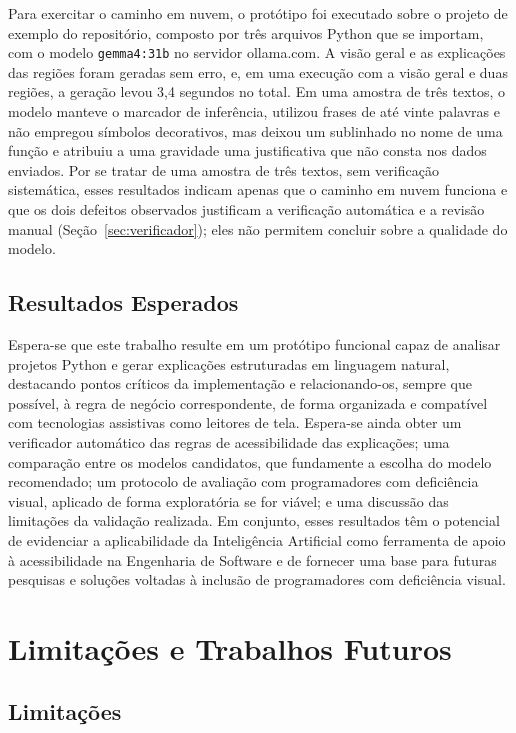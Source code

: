 \documentclass[
    12pt,                   %
    openright,              %
    oneside,                %
    a4paper,                %
    sumario=tradicional,    %
    english,                %
    brazil,                 %
    ]{abntex2}
\begin{document}
Para exercitar o caminho em nuvem, o protótipo foi executado sobre o projeto de exemplo do repositório, composto por três arquivos Python que se importam, com o modelo \texttt{gemma4:31b} no servidor ollama.com. A visão geral e as explicações das regiões foram geradas sem erro, e, em uma execução com a visão geral e duas regiões, a geração levou 3,4 segundos no total. Em uma amostra de três textos, o modelo manteve o marcador de inferência, utilizou frases de até vinte palavras e não empregou símbolos decorativos, mas deixou um sublinhado no nome de uma função e atribuiu a uma gravidade uma justificativa que não consta nos dados enviados. Por se tratar de uma amostra de três textos, sem verificação sistemática, esses resultados indicam apenas que o caminho em nuvem funciona e que os dois defeitos observados justificam a verificação automática e a revisão manual (Seção~\ref{sec:verificador}); eles não permitem concluir sobre a qualidade do modelo.

\section{Resultados Esperados}

Espera-se que este trabalho resulte em um protótipo funcional capaz de analisar projetos Python e gerar explicações estruturadas em linguagem natural, destacando pontos críticos da implementação e relacionando-os, sempre que possível, à regra de negócio correspondente, de forma organizada e compatível com tecnologias assistivas como leitores de tela. Espera-se ainda obter um verificador automático das regras de acessibilidade das explicações; uma comparação entre os modelos candidatos, que fundamente a escolha do modelo recomendado; um protocolo de avaliação com programadores com deficiência visual, aplicado de forma exploratória se for viável; e uma discussão das limitações da validação realizada. Em conjunto, esses resultados têm o potencial de evidenciar a aplicabilidade da Inteligência Artificial como ferramenta de apoio à acessibilidade na Engenharia de Software e de fornecer uma base para futuras pesquisas e soluções voltadas à inclusão de programadores com deficiência visual.


\chapter{Limitações e Trabalhos Futuros}\label{sec:limitacoes}

\section{Limitações}
\end{document}
